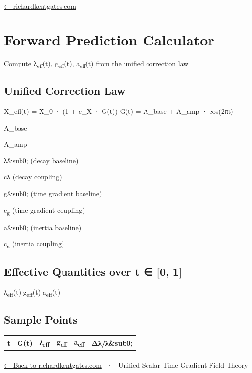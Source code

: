 \documentclass[
  10pt,
]{article}
\author{}
\date{}
\begin{document}
\href{https://richardkentgates.com}{← richardkentgates.com}

\hypertarget{forward-prediction-calculator}{%
\section{Forward Prediction
Calculator}\label{forward-prediction-calculator}}

Compute λ\textsubscript{eff}(t), g\textsubscript{eff}(t),
a\textsubscript{eff}(t) from the unified correction law

\hypertarget{unified-correction-law}{%
\subsection{Unified Correction Law}\label{unified-correction-law}}

X\_eff(t) = X\_0 · (1 + c\_X · G(t)) G(t) = A\_base + A\_amp · cos(2πt)

A\_base

A\_amp

λ\&sub0; (decay baseline)

cλ (decay coupling)

g\&sub0; (time gradient baseline)

c\textsubscript{g} (time gradient coupling)

a\&sub0; (inertia baseline)

c\textsubscript{a} (inertia coupling)

\hypertarget{effective-quantities-over-t-0-1}{%
\subsection{Effective Quantities over t ∈ {[}0,
1{]}}\label{effective-quantities-over-t-0-1}}

{{} λ\textsubscript{eff}(t)} {{} g\textsubscript{eff}(t)} {{}
a\textsubscript{eff}(t)}

\hypertarget{sample-points}{%
\subsection{Sample Points}\label{sample-points}}

\begin{longtable}[]{@{}llllll@{}}
\toprule\noalign{}
t & G(t) & λ\textsubscript{eff} & g\textsubscript{eff} &
a\textsubscript{eff} & Δλ/λ\&sub0; \\
\midrule\noalign{}
\endhead
\bottomrule\noalign{}
\endlastfoot
\end{longtable}

\href{https://richardkentgates.com}{← Back to richardkentgates.com} ~·~
Unified Scalar Time-Gradient Field Theory
\end{document}
